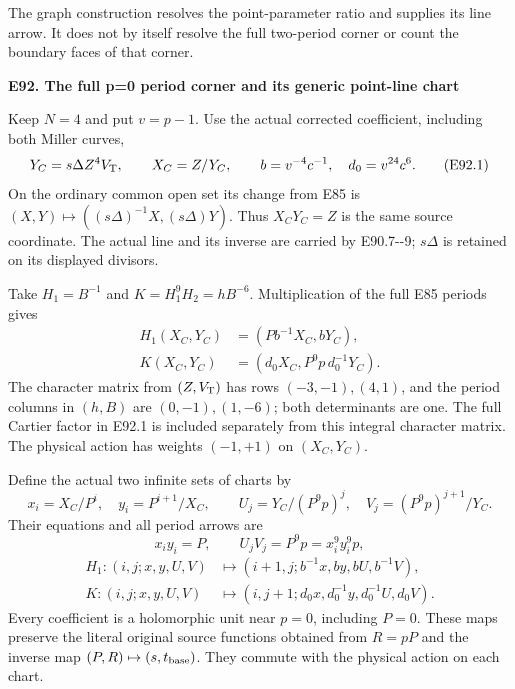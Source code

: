 The graph construction resolves the point-parameter
ratio and supplies its line arrow. It does not by
itself resolve the full two-period corner or count
the boundary faces of that corner.

\par

\medskip\noindent\textbf{E92. The full p=0 period corner and its generic point-line chart}

\par\nobreak

Keep \(N=4\) and put \(v=p-1\). Use the actual corrected
coefficient, including both Miller curves,
\[
 Y_C=s\Delta Z^4V_{\rm T},\qquad X_C=Z/Y_C,\qquad
 b=v^{-4}c^{-1},\quad d_0=v^{24}c^6.             \tag{E92.1}
\]
On the ordinary common open set its change from E85 is
\((X,Y)\mapsto((s\Delta)^{-1}X,(s\Delta)Y)\).
Thus \(X_CY_C=Z\) is the same source coordinate.
The actual line and its inverse are carried by E90.7-\/-9;
\(s\Delta\) is retained on its displayed divisors.

Take \(H_1=B^{-1}\) and \(K=H_1^9H_2=hB^{-6}\).
Multiplication of the full E85 periods gives
\[
\begin{aligned}
 H_1(X_C,Y_C)&=(Pb^{-1}X_C,bY_C),\\
 K(X_C,Y_C)&=(d_0X_C,P^9p\,d_0^{-1}Y_C).
\end{aligned}                                                   \tag{E92.2}
\]
The character matrix from \((Z,V_{\rm T})\) has rows
\((-3,-1),(4,1)\), and the period columns in \((h,B)\)
are \((0,-1),(1,-6)\); both determinants are one.
The full Cartier factor in E92.1 is included separately
from this integral character matrix. The physical action
has weights \((-1,+1)\) on \((X_C,Y_C)\).

Define the actual two infinite sets of charts by
\[
 x_i=X_C/P^i,\quad y_i=P^{i+1}/X_C,\qquad
 U_j=Y_C/(P^9p)^j,\quad V_j=(P^9p)^{j+1}/Y_C.   \tag{E92.3}
\]
Their equations and all period arrows are
\[
 x_iy_i=P,\qquad U_jV_j=P^9p=x_i^9y_i^9p,        \tag{E92.4}
\]
\[
\begin{aligned}
 H_1:(i,j;x,y,U,V)&\longmapsto
 (i+1,j;b^{-1}x,by,bU,b^{-1}V),\\
 K:(i,j;x,y,U,V)&\longmapsto
 (i,j+1;d_0x,d_0^{-1}y,d_0^{-1}U,d_0V).
\end{aligned}                                                   \tag{E92.5}
\]
Every coefficient is a holomorphic unit near \(p=0\),
including \(P=0\). These maps preserve the literal
original source functions obtained from \(R=pP\) and
the inverse map \((P,R)\mapsto(s,t_{\rm base})\).
They commute with the physical action on each chart.

